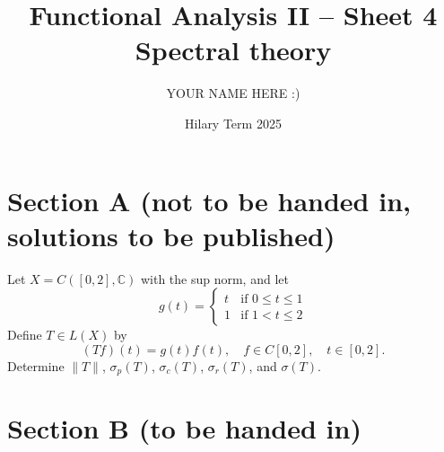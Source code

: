 \documentclass[answers]{exam}
\title{Functional Analysis II -- Sheet 4\\Spectral theory}
\author{YOUR NAME HERE :)}
\date{Hilary Term 2025}
\begin{document}
\maketitle

\section*{Section A \large(not to be handed in, solutions to be published)}

\begin{questions}

\question%
Let $X=C([0,2], \mathbb{C})$ with the sup norm, and let \[
	g(t)= \begin{cases}
		t & \text{if } 0 \leqslant t \leqslant 1 \\
		1 & \text{if } 1<t \leqslant 2
	\end{cases}
\] Define $T \in L(X)$ by \[
	(T f)(t)=g(t) f(t), \quad f \in C[0,2], \quad t \in[0,2] .
\] Determine $\|T\|$, $\sigma_{p}(T)$, $\sigma_{c}(T)$, $\sigma_{r}(T)$, and $\sigma(T)$.

\end{questions}



\section*{Section B \large(to be handed in)}
\end{document}
